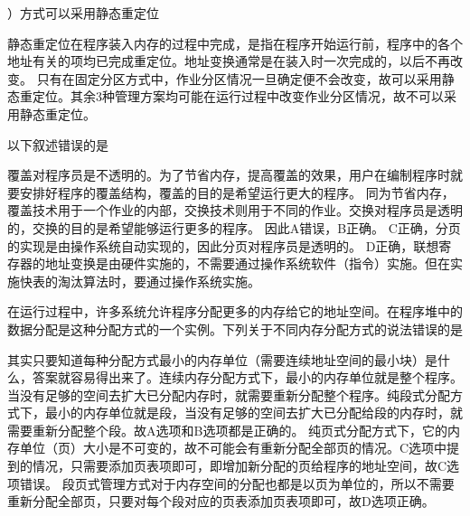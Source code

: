 ）方式可以采用静态重定位
\par{}
\begin{solution}静态重定位在程序装入内存的过程中完成，是指在程序开始运行前，程序中的各个地址有关的项均已完成重定位。地址变换通常是在装入时一次完成的，以后不再改变。
只有在固定分区方式中，作业分区情况一旦确定便不会改变，故可以采用静态重定位。其余3种管理方案均可能在运行过程中改变作业分区情况，故不可以采用静态重定位。
\end{solution}
\question 以下叙述错误的是
\par{}
\begin{solution}覆盖对程序员是不透明的。为了节省内存，提高覆盖的效果，用户在编制程序时就要安排好程序的覆盖结构，覆盖的目的是希望运行更大的程序。
同为节省内存，覆盖技术用于一个作业的内部，交换技术则用于不同的作业。交换对程序员是透明的，交换的目的是希望能够运行更多的程序。
因此A错误，B正确。
C正确，分页的实现是由操作系统自动实现的，因此分页对程序员是透明的。
D正确，联想寄存器的地址变换是由硬件实施的，不需要通过操作系统软件（指令）实施。但在实施快表的淘汰算法时，要通过操作系统实施。
\end{solution}
\question 在运行过程中，许多系统允许程序分配更多的内存给它的地址空间。在程序堆中的数据分配是这种分配方式的一个实例。下列关于不同内存分配方式的说法错误的是
\par{}
\begin{solution}其实只要知道每种分配方式最小的内存单位（需要连续地址空间的最小块）是什么，答案就容易得出来了。连续内存分配方式下，最小的内存单位就是整个程序。当没有足够的空间去扩大已分配内存时，就需要重新分配整个程序。纯段式分配方式下，最小的内存单位就是段，当没有足够的空间去扩大已分配给段的内存时，就需要重新分配整个段。故A选项和B选项都是正确的。
纯页式分配方式下，它的内存单位（页）大小是不可变的，故不可能会有重新分配全部页的情况。C选项中提到的情况，只需要添加页表项即可，即增加新分配的页给程序的地址空间，故C选项错误。
段页式管理方式对于内存空间的分配也都是以页为单位的，所以不需要重新分配全部页，只要对每个段对应的页表添加页表项即可，故D选项正确。
\end{solution}
